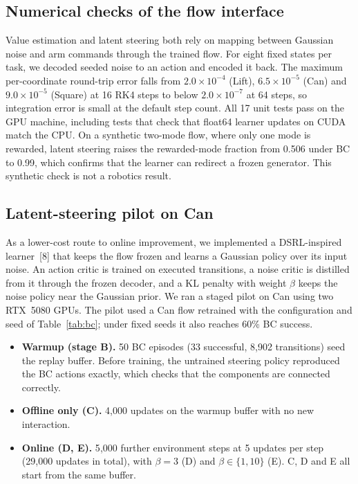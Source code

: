 \subsection{Numerical checks of the flow interface}

Value estimation and latent steering both rely on mapping between Gaussian noise
and arm commands through the trained flow. For eight fixed states per task, we
decoded seeded noise to an action and encoded it back. The maximum
per-coordinate round-trip error falls from $2.0\times10^{-4}$ (Lift),
$6.5\times10^{-5}$ (Can) and $9.0\times10^{-5}$ (Square) at 16 RK4 steps to below
$2.0\times10^{-7}$ at 64 steps, so integration error is small at the default
step count. All 17 unit tests pass on the GPU machine, including tests that
check that float64 learner updates on CUDA match the CPU. On a synthetic two-mode flow, where
only one mode is rewarded, latent steering raises the rewarded-mode fraction
from 0.506 under BC to 0.99, which confirms that the learner can redirect a
frozen generator. This synthetic check is not a robotics result.

\subsection{Latent-steering pilot on Can}

As a lower-cost route to online improvement, we implemented a DSRL-inspired
learner~[8] that keeps the flow frozen and learns a Gaussian policy over its
input noise. An action critic is trained on executed transitions, a noise critic
is distilled from it through the frozen decoder, and a KL penalty with weight
$\beta$ keeps the noise policy near the Gaussian prior. We ran a staged pilot on
Can using two RTX~5080 GPUs. The pilot used a Can flow retrained with the
configuration and seed of Table~\ref{tab:bc}; under fixed seeds it also reaches
60\% BC success.

\begin{itemize}
  \item \textbf{Warmup (stage B).} 50 BC episodes (33 successful, 8{,}902
  transitions) seed the replay buffer. Before training, the untrained steering
  policy reproduced the BC actions exactly, which checks that the components are
  connected correctly.
  \item \textbf{Offline only (C).} 4{,}000 updates on the warmup buffer with no
  new interaction.
  \item \textbf{Online (D, E).} 5{,}000 further environment steps at 5 updates
  per step (29{,}000 updates in total), with $\beta=3$ (D) and $\beta\in\{1,10\}$
  (E). C, D and E all start from the same buffer.
\end{itemize}


